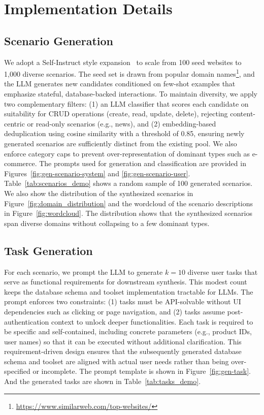 \appendix
\onecolumn


\section{Implementation Details} \label{appendix:full_implementation_details}

\subsection{Scenario Generation} \label{appendix:scenario_generation}

We adopt a Self-Instruct style expansion~\citep{selfinstruct} to scale from 100 seed websites to 1,000 diverse scenarios.
The seed set is drawn from popular domain names\footnote{\url{https://www.similarweb.com/top-websites/}}, and the LLM generates new candidates conditioned on few-shot examples that emphasize stateful, database-backed interactions.
To maintain diversity, we apply two complementary filters: (1) an LLM classifier that scores each candidate on suitability for CRUD operations (create, read, update, delete), rejecting content-centric or read-only scenarios (e.g., news), and (2) embedding-based deduplication using cosine similarity with a threshold of 0.85, ensuring newly generated scenarios are sufficiently distinct from the existing pool.
We also enforce category caps to prevent over-representation of dominant types such as e-commerce.
The prompts used for generation and classification are provided in Figures~\ref{fig:gen-scenario-system} and \ref{fig:gen-scenario-user}.
Table~\ref{tab:scenarios_demo} shows a random sample of 100 generated scenarios.
We also show the distribution of the synthesized scenarios in Figure~\ref{fig:domain_distribution} and the wordcloud of the scenario descriptions in Figure~\ref{fig:wordcloud}.
The distribution shows that the synthesized scenarios span diverse domains without collapsing to a few dominant types.

\subsection{Task Generation} \label{appendix:task_generation}

For each scenario, we prompt the LLM to generate $k=10$ diverse user tasks that serve as functional requirements for downstream synthesis.
This modest count keeps the database schema and toolset implementation tractable for LLMs.
The prompt enforces two constraints: (1) tasks must be API-solvable without UI dependencies such as clicking or page navigation, and (2) tasks assume post-authentication context to unlock deeper functionalities.
Each task is required to be specific and self-contained, including concrete parameters (e.g., product IDs, user names) so that it can be executed without additional clarification.
This requirement-driven design ensures that the subsequently generated database schema and toolset are aligned with actual user needs rather than being over-specified or incomplete.
The prompt template is shown in Figure~\ref{fig:gen-task}. And the generated tasks are shown in Table~\ref{tab:tasks_demo}.

